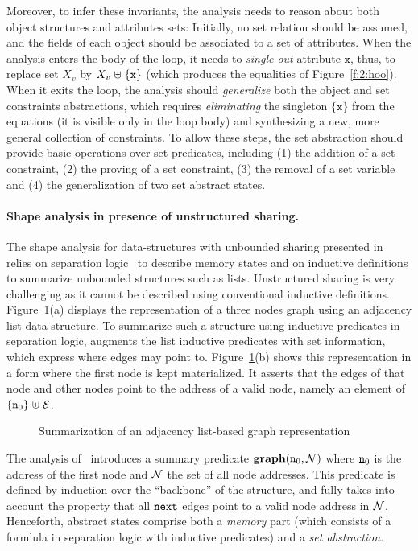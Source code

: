 Moreover, to infer these invariants, the analysis needs to reason
about both object structures and attributes sets:
Initially, no set relation should be assumed, and the fields of
  each object should be associated to a set of attributes.
When the analysis enters the body of the loop, it needs to
  {\em single out} attribute \( \mathtt{x} \), thus, to replace set
  \( X_v \) by \( X_v \mathrel{\uplus} \{ \mathtt{x} \} \) (which produces the
  equalities of Figure~\ref{f:2:hoo}).
When it exits the loop, the analysis should {\em generalize}
  both the object and set constraints abstractions, which requires
   {\em eliminating} the singleton \( \{ \mathtt{x} \} \) from the
  equations (it is visible only in the loop body) and synthesizing
  a new, more general collection of constraints.
To allow these steps, the set abstraction should provide basic operations
over set predicates, including (1) the addition of a set constraint, (2)
the proving of a set constraint, (3) the removal of a set variable and
(4) the generalization of two set abstract states.

\paragraph{Shape analysis in presence of unstructured sharing.}
The shape analysis for data-structures with unbounded sharing presented
in~\cite{memcad:15:sas} relies on separation logic~\cite{r:lics:02} to
describe memory states and on inductive definitions to summarize
unbounded structures such as lists.
Unstructured sharing is very challenging as it cannot be described using
conventional inductive definitions.
Figure~\ref{f:3:memcad}(a) displays the representation of a three nodes
graph using an adjacency list data-structure.
To summarize such a structure using inductive predicates in separation
logic, \cite{memcad:15:sas} augments the list inductive
predicates with set information, which express where edges may point to.
Figure~\ref{f:3:memcad}(b) shows this representation in
a form where the first node is kept materialized.
It asserts that the edges of that node and other nodes
point to the address of a valid node, namely an element of \( \{ \texttt{n}_{0}
\} \mathrel{\uplus} \mathcal{E} \).
\begin{figure}[t]
  \newcommand{\picscale}{0.9}
  \tikzpics{\picscale}{memcad-inv}
  \caption{Summarization of an adjacency list-based graph representation}
  \label{f:3:memcad}
\end{figure}
The analysis of~\cite{memcad:15:sas} introduces a summary predicate
\( \textbf{graph}( \texttt{n}_{0}, \mathcal{N} ) \) where \( \texttt{n}_{0} \) is the
address of the first node and \( \mathcal{N} \) the set of all node addresses.
This predicate is defined by induction over the ``backbone'' of the
structure, and fully takes into account the property that all
\( \mathtt{next} \) edges point to a valid node address in \( \mathcal{N} \).
Henceforth, abstract states comprise both a {\em memory} part (which
consists of a formlula in separation logic with inductive predicates)
and a {\em set abstraction}.

